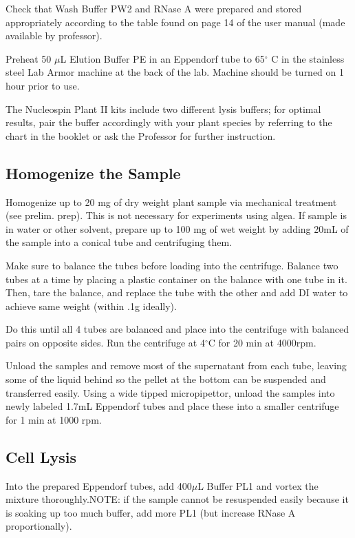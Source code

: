 \documentclass[12pt]{../SOP3_beta}\usepackage[]{graphicx}\usepackage[]{xcolor}
\begin{document}
\NP	Check that Wash Buffer PW2 and RNase A were prepared and stored appropriately according to the table found on page 14 of the user manual (made available by professor).

\NP Preheat 50 $\mu$L Elution Buffer PE in an Eppendorf tube to 65$^\circ$ C in the stainless steel Lab Armor machine at the back of the lab. Machine should be turned on 1 hour prior to use.

\NP The Nucleospin Plant II kits include two different lysis buffers; for optimal results, pair the buffer accordingly with your plant species by referring to the chart in the booklet or ask the Professor for further instruction. 


\subsection*{Homogenize the Sample}

\NP Homogenize up to 20 mg of dry weight plant sample via mechanical treatment (see prelim. prep). This is not necessary for experiments using algea. If sample is in water or other solvent, prepare up to 100 mg of wet weight by adding 20mL of the sample into a conical tube and centrifuging them. 

\NP Make sure to balance the tubes before loading into the centrifuge. Balance two tubes at a time by placing a plastic container on the balance with one tube in it. Then, tare the balance, and replace the tube with the other and add DI water to achieve same weight (within .1g ideally).

\NP Do this until all 4 tubes are balanced and place into the centrifuge with balanced pairs on opposite sides. Run the centrifuge at 4$^\circ$C for 20 min at 4000rpm.

\NP Unload the samples and remove most of the supernatant from each tube, leaving some of the liquid behind so the pellet at the bottom can be suspended and transferred easily. Using a wide tipped micropipettor, unload the samples into newly labeled 1.7mL Eppendorf tubes and place these into a smaller centrifuge for 1 min at 1000 rpm.


\subsection*{Cell Lysis}

\NP Into the prepared Eppendorf tubes, add 400$\mu$L Buffer PL1 and vortex the mixture thoroughly.NOTE: if the sample cannot be resuspended easily because it is soaking up too much buffer, add more PL1 (but increase RNase A proportionally).
\end{document}
